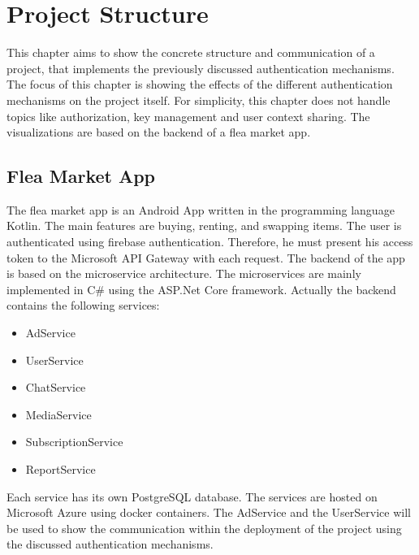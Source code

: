 \chapter{Project Structure}
\label{cha:project_structure}
This chapter aims to show the concrete structure and communication of a project, that implements the previously discussed authentication mechanisms.
The focus of this chapter is showing the effects of the different authentication mechanisms on the project itself.
For simplicity, this chapter does not handle topics like authorization, key management and user context sharing.
The visualizations are based on the backend of a flea market app.

\section{Flea Market App}
The flea market app is an Android App written in the programming language Kotlin.
The main features are buying, renting, and swapping items.
The user is authenticated using firebase authentication.
Therefore, he must present his access token to the Microsoft API Gateway with each request.
The backend of the app is based on the microservice architecture.
The microservices are mainly implemented in C\# using the ASP.Net Core framework.
Actually the backend contains the following services:
\begin{itemize}
	\item AdService
	\item UserService
	\item ChatService
	\item MediaService
	\item SubscriptionService
	\item ReportService
\end{itemize}
Each service has its own PostgreSQL database.
The services are hosted on Microsoft Azure using docker containers.
The AdService and the UserService will be used to show the communication within the deployment of the project using the discussed authentication mechanisms.

